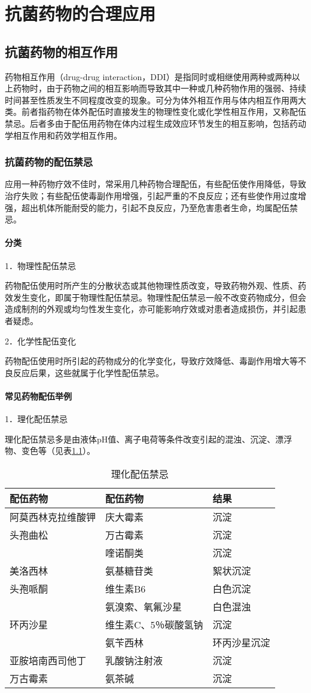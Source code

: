 \chapter{抗菌药物的合理应用}

\section{抗菌药物的相互作用}

药物相互作用（drug-drug
interaction，DDI）是指同时或相继使用两种或两种以上药物时，由于药物之间的相互影响而导致其中一种或几种药物作用的强弱、持续时间甚至性质发生不同程度改变的现象。可分为体外相互作用与体内相互作用两大类。前者指药物在体外配伍时直接发生的物理性变化或化学性相互作用，又称配伍禁忌。后者多由于配伍用药物在体内过程生成效应环节发生的相互影响，包括药动学相互作用和药效学相互作用。

\subsection{抗菌药物的配伍禁忌}

应用一种药物疗效不佳时，常采用几种药物合理配伍，有些配伍使作用降低，导致治疗失败；有些配伍使毒副作用增强，引起严重的不良反应；还有些使作用过度增强，超出机体所能耐受的能力，引起不良反应，乃至危害患者生命，均属配伍禁忌。

\subsubsection{分类}

1．物理性配伍禁忌

药物配伍使用时所产生的分散状态或其他物理性质改变，导致药物外观、性质、药效发生变化，即属于物理性配伍禁忌。物理性配伍禁忌一般不改变药物成分，但会造成制剂的外观或均匀性发生变化，亦可能影响疗效或对患者造成损伤，并引起患者疑虑。

2．化学性配伍变化

药物配伍使用时所引起的药物成分的化学变化，导致疗效降低、毒副作用增大等不良反应后果，这些就属于化学性配伍禁忌。

\subsubsection{常见药物配伍举例}

1．理化配伍禁忌

理化配伍禁忌多是由液体pH值、离子电荷等条件改变引起的混浊、沉淀、漂浮物、变色等（见表\ref{tab8-1}）。

\begin{longtable}[]{@{}lll@{}}
\caption{理化配伍禁忌}
\label{tab8-1}\\
\toprule
\endhead
配伍药物 & 配伍药物 & 结果\tabularnewline
\midrule
阿莫西林克拉维酸钾 & 庆大霉素 & 沉淀\tabularnewline
头孢曲松 & 万古霉素 & 沉淀\tabularnewline
& 喹诺酮类 & 沉淀\tabularnewline
美洛西林 & 氨基糖苷类 & 絮状沉淀\tabularnewline
头孢哌酮 & 维生素B{6} & 白色沉淀\tabularnewline
& 氨溴索、氧氟沙星 & 白色混浊\tabularnewline
环丙沙星 & 维生素C、5％碳酸氢钠 & 沉淀\tabularnewline
& 氨苄西林 & 环丙沙星沉淀\tabularnewline
亚胺培南西司他丁 & 乳酸钠注射液 & 沉淀\tabularnewline
万古霉素 & 氨茶碱 & 沉淀\tabularnewline
\bottomrule
\end{longtable}


